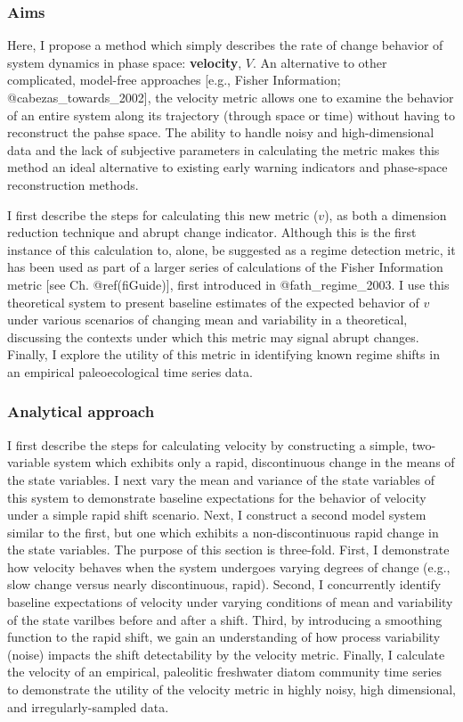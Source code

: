 \documentclass[]{article}
\begin{document}
\hypertarget{aims}{%
\subsubsection{Aims}\label{aims}}

Here, I propose a method which simply describes the rate of change
behavior of system dynamics in phase space: \textbf{velocity}, \(V\). An
alternative to other complicated, model-free approaches {[}e.g., Fisher
Information; @cabezas\_towards\_2002{]}, the velocity metric allows one
to examine the behavior of an entire system along its trajectory
(through space or time) without having to reconstruct the pahse space.
The ability to handle noisy and high-dimensional data and the lack of
subjective parameters in calculating the metric makes this method an
ideal alternative to existing early warning indicators and phase-space
reconstruction methods.

I first describe the steps for calculating this new metric (\(v\)), as
both a dimension reduction technique and abrupt change indicator.
Although this is the first instance of this calculation to, alone, be
suggested as a regime detection metric, it has been used as part of a
larger series of calculations of the Fisher Information metric {[}see
Ch. @ref(fiGuide){]}, first introduced in @fath\_regime\_2003. I use
this theoretical system to present baseline estimates of the expected
behavior of \(v\) under various scenarios of changing mean and
variability in a theoretical, discussing the contexts under which this
metric may signal abrupt changes. Finally, I explore the utility of this
metric in identifying known regime shifts in an empirical
paleoecological time series data.

\hypertarget{analytical-approach}{%
\subsubsection{Analytical approach}\label{analytical-approach}}

I first describe the steps for calculating velocity by constructing a
simple, two-variable system which exhibits only a rapid, discontinuous
change in the means of the state variables. I next vary the mean and
variance of the state variables of this system to demonstrate baseline
expectations for the behavior of velocity under a simple rapid shift
scenario. Next, I construct a second model system similar to the first,
but one which exhibits a non-discontinuous rapid change in the state
variables. The purpose of this section is three-fold. First, I
demonstrate how velocity behaves when the system undergoes varying
degrees of change (e.g., slow change versus nearly discontinuous,
rapid). Second, I concurrently identify baseline expectations of
velocity under varying conditions of mean and variability of the state
varilbes before and after a shift. Third, by introducing a smoothing
function to the rapid shift, we gain an understanding of how process
variability (noise) impacts the shift detectability by the velocity
metric. Finally, I calculate the velocity of an empirical, paleolitic
freshwater diatom community time series to demonstrate the utility of
the velocity metric in highly noisy, high dimensional, and
irregularly-sampled data.
\end{document}
